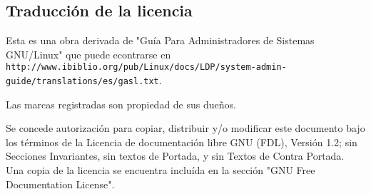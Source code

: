 \documentclass[12pt]{article}
\begin{document}
\subsection{Traducción de la licencia}
Esta es una obra derivada de "Guía Para Administradores de Sistemas GNU/Linux" que puede 
econtrarse en \\ \texttt{http://www.ibiblio.org/pub/Linux/docs/LDP/system-admin-guide/translations/es/gasl.txt}.

Las marcas registradas son propiedad de sus dueños.

Se concede autorización para copiar, distribuir y/o modificar este documento
bajo los términos de la Licencia de documentación libre GNU (FDL), Versión 1.2; 
sin Secciones Invariantes, sin textos de Portada, y sin Textos de Contra Portada. 
Una copia de la licencia se encuentra incluída en la sección "GNU Free Documentation License".
\end{document}
